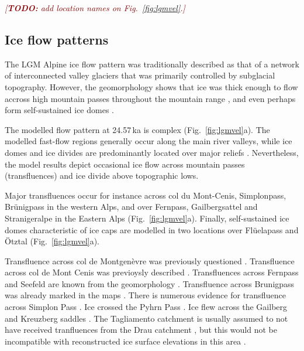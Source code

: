 \documentclass[tc, manuscript]{copernicus}
\newcommand{\todo}[1]{\textcolor{darkred}{\emph{[\textbf{TODO:} #1]}}}
\begin{document}
    \todo{add location names on Fig.~\ref{fig:lgmvel}.}


\subsection{Ice flow patterns}
\label{sec:flow}

    The LGM Alpine ice flow pattern was traditionally described as that of a
    network of interconnected valley glaciers that was primarily controlled by
    subglacial topography. However, the geomorphology shows that ice was thick
    enough to flow accross high mountain passes throughout the mountain range
    \citep[e.g.,][]{Onde.1938, Penck.Bruckner.1909, Jackli.1962, Husen.1985,
    Coutterand.2010, Kelly.etal.2004, Husen.2011}, and even perhaps form
    self-sustained ice domes \citep{Florineth.1998, Florineth.Schluchter.1998,
    Kelly.etal.2004, Bini.etal.2009}.

    The modelled flow pattern at 24.57\,ka is complex (Fig.~\ref{fig:lgmvel}a).
    The modelled fast-flow regions generally occur along the main river
    valleys, while ice domes and ice divides are predominantly located over
    major reliefs . Nevertheless, the model results depict occasional ice flow
    across mountain passes (transfluences) and ice divide above topographic
    lows.

    Major transfluences occur for instance across col du Mont-Cenis,
    Simplonpass, Brünigpass in the western Alps, and over Fernpass,
    Gailbergsattel and Stranigeralpe in the Eastern Alps
    (Fig.~\ref{fig:lgmvel}a). Finally, self-sustained ice domes characteristic
    of ice caps are modelled in two locations over Flüelapass and Ötztal
    (Fig.~\ref{fig:lgmvel}a).

    Transfluence across col de Montgenèvre was previously questioned
    \citep[Fig.~2]{Cossart.etal.2012}. Transfluence across col de Mont Cenis
    was previoysly described \citep[Fig.~3.18]{Onde.1938, Coutterand.2010}.
    Transfluences across Fernpass and Seefeld are known from the geomorphology
    \citep[Fig.~2.4]{Penck.Bruckner.1909, Husen.2011}. Transfluence across
    Brunigpass was already marked in the maps \citep{Jackli.1962}. There is
    numerous evidence for transfluence across Simplon Pass
    \citep{Kelly.etal.2004}. Ice crossed the Pyhrn Pass \citep{Husen.2004}. Ice
    flew across the Gailberg and Kreuzberg saddles \citep{Husen.1985}. The
    Tagliamento catchment is usually assumed to not have received tranfluences
    from the Drau catchment \citep{Monegato.etal.2007}, but this would not be
    incompatible with reconstructed ice surface elevations in this area
    \citep{Husen.1987}.
\end{document}
